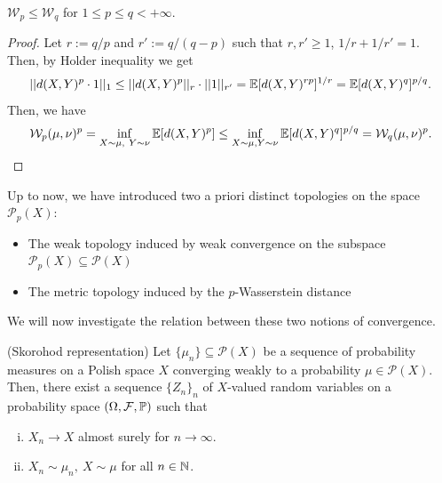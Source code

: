 \documentclass[../main.tex]{subfiles}
\begin{document}
\begin{proposition}
    \label{prop:wasserstein_space_ordering}
    $\mathcal{W}_p\leq \mathcal{W}_q$ for $1\leq p \leq q<+\infty$.
\end{proposition}
\begin{proof}
    Let $r:= q/p$ and $r':=q/(q-p)$ such that $r, r'\geq 1$, $1/r + 1/r' = 1$. Then, by Holder inequality we get
    \begin{align*}
        ||d(X, Y)^p \cdot 1||_1 
        \leq ||d(X, Y)^p||_r \cdot ||1||_{r'}
        = \mathbb{E}[d(X, Y)^{rp}]^{1/r}
        = \mathbb{E}[d(X, Y)^q]^{p/q}.
    \end{align*}
    Then, we have
    \begin{align*}
        \mathcal{W}_p(\mu, \nu)^p = \inf_{X\sim\mu, \ Y\sim\nu} \mathbb{E}[d(X, Y)^p] \leq \inf_{X\sim\mu, Y\sim\nu} \mathbb{E}[d(X, Y)^q]^{p/q} = \mathcal{W}_q(\mu, \nu)^p. 
    \end{align*}
\end{proof}

\begin{remark}
    Up to now, we have introduced two a priori distinct topologies on the space $\mathcal{P}_p(X)$:
    \begin{itemize}
        \item The weak topology induced by weak convergence on the subspace $\mathcal{P}_p(X)\subseteq \mathcal{P}(X)$
        \item The metric topology induced by the $p$-Wasserstein distance
    \end{itemize}
We will now investigate the relation between these two notions of convergence.
\end{remark}

\begin{theorem}
    (Skorohod representation) Let $\{\mu_n\}\subseteq\mathcal{P}(X)$ be a sequence of probability measures on a Polish space $X$ converging weakly to a probability $\mu\in\mathcal{P}(X)$. \\
    Then, there exist a sequence $\{Z_n\}_n$ of $X$-valued random variables on a probability space $(\Omega, \mathcal{F},\mathbb{P})$ such that
    \begin{enumerate}[(i)]
        \item $X_n \to X$ almost surely for $n\to\infty$.
        \item $X_n\sim\mu_n, \ X\sim\mu$ for all $n\in\mathbb{N}$.
    \end{enumerate}
\end{theorem}
\end{document}
